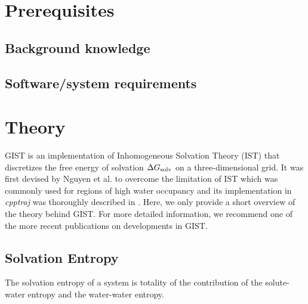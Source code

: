 \documentclass[9pt,tutorial]{livecoms}
\newcommand{\dgsolv}{\Delta G_\textup{solv}}
\newcommand{\software}{\emph}
\begin{document}
\section{Prerequisites}


\subsection{Background knowledge}

\subsection{Software/system requirements}



\section{Theory}
GIST is an implementation of Inhomogeneous Solvation Theory (IST) \cite{Lazaridis1998} that discretizes  the free energy of solvation $\dgsolv$ on a three-dimensional grid. 
It was first devised by Nguyen et al. \cite{Nguyen2012} to overcome the limitation of IST which was commonly used for regions of high water occupancy and its implementation in \software{cpptraj} was thoroughly described in \cite{Ramsey2016}.
Here, we only provide a short overview of the theory behind GIST.
For more detailed information, we recommend one of the more recent publications on developments in GIST. \cite{Kraml2020}\cite{Chen2021}


\subsection{Solvation Entropy}
The solvation entropy of a system is totality of the contribution of the  solute-water entropy and the water-water entropy. 
\end{document}
